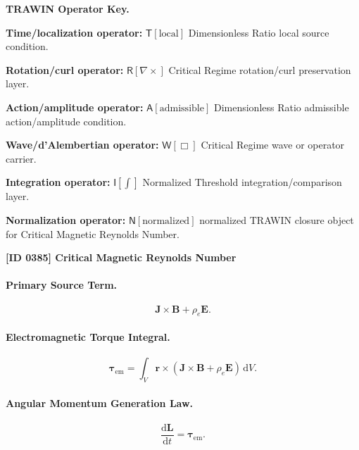 \par\vspace{0.45\baselineskip}
\noindent\begin{minipage}[t]{\linewidth}
\begingroup
\small
\raggedright
\textbf{TRAWIN Operator Key.}\par
\noindent\textbf{Time/localization operator:} $\mathsf{T}\!\left[\mathrm{local}\right]$ Dimensionless Ratio local source condition.\par
\noindent\textbf{Rotation/curl operator:} $\mathsf{R}\!\left[\nabla\times\right]$ Critical Regime rotation/curl preservation layer.\par
\noindent\textbf{Action/amplitude operator:} $\mathsf{A}\!\left[\mathrm{admissible}\right]$ Dimensionless Ratio admissible action/amplitude condition.\par
\noindent\textbf{Wave/d'Alembertian operator:} $\mathsf{W}\!\left[\Box\right]$ Critical Regime wave or operator carrier.\par
\noindent\textbf{Integration operator:} $\mathsf{I}\!\left[\int\right]$ Normalized Threshold integration/comparison layer.\par
\noindent\textbf{Normalization operator:} $\mathsf{N}\!\left[\mathrm{normalized}\right]$ normalized TRAWIN closure object for Critical Magnetic Reynolds Number.\par
\endgroup
\end{minipage}

\clearpage
\noindent\textbf{[ID 0385] Critical Magnetic Reynolds Number}\par
\vspace{0.35em}
\paragraph{Primary Source Term.}
\begin{equation}
\mathbf{J}\times\mathbf{B}
+
\rho_e\mathbf{E}.
\end{equation}

\paragraph{Electromagnetic Torque Integral.}
\begin{equation}
\boldsymbol{\tau}_{\mathrm{em}}
=
\int_V
\mathbf{r}\times
\left(
\mathbf{J}\times\mathbf{B}
+
\rho_e\mathbf{E}
\right)
\,\mathrm{d}V .
\end{equation}

\paragraph{Angular Momentum Generation Law.}
\begin{equation}
\frac{\mathrm{d}\mathbf{L}}{\mathrm{d}t}
=
\boldsymbol{\tau}_{\mathrm{em}} .
\end{equation}

